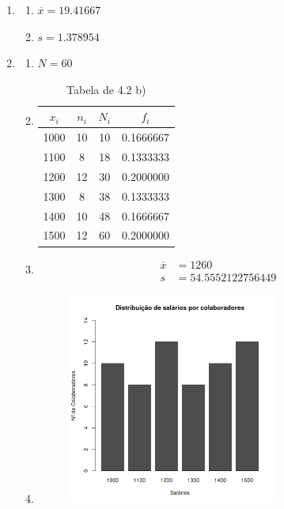 \documentclass[11pt,a4paper]{article}
\begin{document}
\begin{enumerate}[label=\arabic{section}.\arabic*]
	\item {}
		\begin{enumerate}[label=\alph*)]
		\item $\overline{x} = 19.41667$\hfill
			
		\item $s = 1.378954$\hfill
			
		\end{enumerate}
		\clearpage
	\item {}\hfill
		\begin{enumerate}[label=\alph*)]
		\item $N = 60$\hfill
			
		\item \hfill
			\begin{table}[h!]
				\centering
				\begin{tabular}{|c|c|c|c|}
					\hline
					$x_i$&$n_i$&$N_i$&$f_i$ \\
					\hline
					1000&10&10&0.1666667\\
					\hline
					1100& 8&18&0.1333333\\
					\hline
					1200&12&30&0.2000000\\
					\hline
					1300& 8&38&0.1333333\\
					\hline
					1400&10&48&0.1666667\\
					\hline
					1500&12&60&0.2000000\\
					\hline
				\end{tabular}
				\caption{Tabela de 4.2 b)}
			\end{table}
			
		\item \hfill
			\begin{align*}
				\overline{x} &= 1260 \\
				s &= 54.5552122756449
			\end{align*}
			
			\clearpage
		\item \hfill
			\begin{figure}[h!]
				\centering
				\includegraphics[width=0.7\textwidth]{./recursos/ex4_2d.png}

\end{figure}
\end{enumerate}
\end{enumerate}
\end{document}
